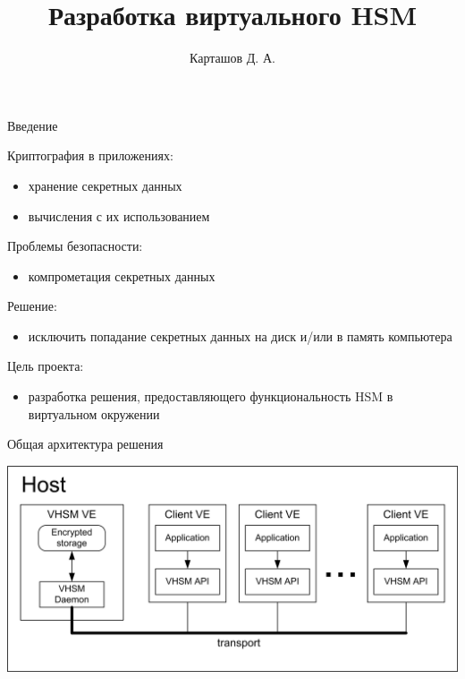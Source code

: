 \documentclass[utf8, 11pt]{beamer}
\author[ ]{Карташов Д. А.}
\title[Virtual HSM]{Разработка виртуального HSM}
\institute[СПбАУ]
{
  Кафедра математических и информационных технологий\\
  Санкт-Петербургский Академический университет
}
\date{ }
\begin{document}
\begin{frame}
  \titlepage
\end{frame}

\begin{frame}{Введение}

Криптография в приложениях:
\begin{itemize}
\item хранение секретных данных
\item вычисления с их использованием
\end{itemize}

\vspace*{\fill}

Проблемы безопасности:
\begin{itemize}
\item компрометация секретных данных
\end{itemize}

\vspace*{\fill}

Решение:
\begin{itemize}
\item исключить попадание секретных данных на диск и/или в память компьютера
\end{itemize}

\vspace*{\fill}

Цель проекта:
\begin{itemize}
\item разработка решения, предоставляющего функциональность HSM в виртуальном окружении
\end{itemize}

\end{frame}

\begin{frame}{Общая архитектура решения}
\begin{center}
\includegraphics[width=0.94\paperwidth]{img2}
\end{center}
\end{frame}
\end{document}
